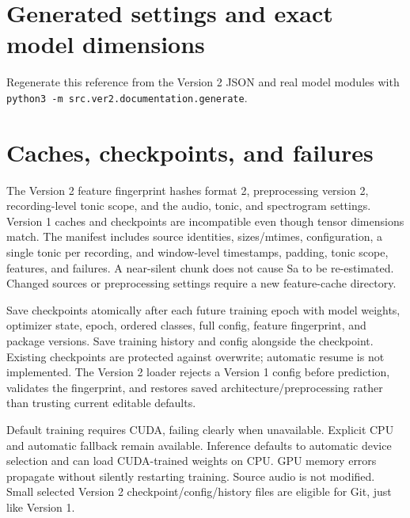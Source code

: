 \documentclass[11pt,a4paper]{article}
\begin{document}
\section{Generated settings and exact model dimensions}
Regenerate this reference from the Version 2 JSON and real model modules with
\texttt{python3 -m src.ver2.documentation.generate}.


\section{Caches, checkpoints, and failures}
The Version 2 feature fingerprint hashes format 2, preprocessing version 2,
recording-level tonic scope, and the audio, tonic, and spectrogram settings.
Version 1 caches and checkpoints are incompatible
even though tensor dimensions match. The manifest includes source identities,
sizes/mtimes, configuration, a single tonic per recording, and window-level
timestamps, padding, tonic scope, features, and failures. A near-silent chunk does
not cause Sa to be re-estimated. Changed sources or preprocessing settings require
a new feature-cache directory.

Save checkpoints atomically after each future training epoch with model weights,
optimizer state, epoch, ordered classes, full config, feature fingerprint, and
package versions. Save training history and config alongside the checkpoint.
Existing checkpoints are protected against overwrite; automatic resume is not
implemented. The Version 2 loader rejects a Version 1 config before prediction,
validates the fingerprint, and restores saved architecture/preprocessing rather
than trusting current editable defaults.

Default training requires CUDA, failing clearly when unavailable. Explicit CPU
and automatic fallback remain available. Inference defaults to automatic device
selection and can load CUDA-trained weights on CPU. GPU memory errors propagate
without silently restarting training. Source audio is not modified. Small selected
Version 2 checkpoint/config/history files are eligible for Git, just like Version 1.
\end{document}
